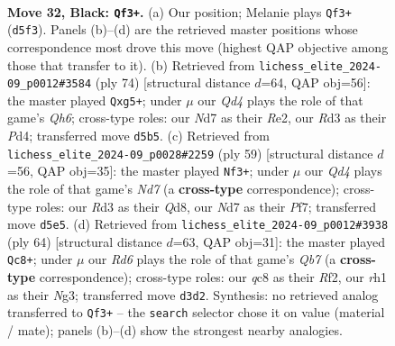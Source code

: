 \documentclass[11pt]{article}
\begin{document}
\clearpage

\begin{figure}[p]\centering
\begin{subfigure}{0.46\textwidth}\centering
\resizebox{\linewidth}{!}{%
\newchessgame
\chessboard[
  setfen={2Q5/pp1n2kp/7p/1P1q4/3P4/3r4/4NK2/R6R b - - 0 32},
  showmover=false,
  pgfstyle=straightmove, color=movearrow, markmove={d5-f3}
]}
\caption{}
\end{subfigure}\hfill
\begin{subfigure}{0.46\textwidth}\centering
\resizebox{\linewidth}{!}{%
\newchessgame
\chessboard[
  setfen={5rk1/p1p5/Pp5Q/1q2N1p1/3P4/7P/4RP2/6K1 w - - 1 38},
  showmover=false,
  pgfstyle=straightmove, color=movearrow, markmove={h6-g5}
]}
\caption{}
\end{subfigure}
\\[4pt]
\begin{subfigure}{0.46\textwidth}\centering
\resizebox{\linewidth}{!}{%
\newchessgame
\chessboard[
  setfen={3q1k2/3P1p1Q/p5p1/1p4P1/8/8/r2n1PP1/1R2R1K1 b - - 2 30},
  showmover=false,
  pgfstyle=straightmove, color=movearrow, markmove={d2-f3}
]}
\caption{}
\end{subfigure}\hfill
\begin{subfigure}{0.46\textwidth}\centering
\resizebox{\linewidth}{!}{%
\newchessgame
\chessboard[
  setfen={7k/pQ5p/8/2p1p1q1/2P2r2/6NP/PP3R1K/8 w - - 1 33},
  showmover=false,
  pgfstyle=straightmove, color=movearrow, markmove={b7-c8}
]}
\caption{}
\end{subfigure}
\caption{\textbf{Move 32, Black: \texttt{Qf3+}.} (a) Our position; Melanie plays \texttt{Qf3+} (\texttt{d5f3}). Panels (b)--(d) are the retrieved master positions whose correspondence most drove this move (highest QAP objective among those that transfer to it). (b) Retrieved from \texttt{lichess\_elite\_2024-09\_p0012\#3584} (ply 74) [structural distance $d$=64, QAP obj=56]: the master played \texttt{Qxg5+}; under $\mu$ our \emph{Qd4} plays the role of that game's \emph{Qh6}; cross-type roles: our \emph{N}d7 as their \emph{R}e2, our \emph{R}d3 as their \emph{P}d4; transferred move \texttt{d5b5}. (c) Retrieved from \texttt{lichess\_elite\_2024-09\_p0028\#2259} (ply 59) [structural distance $d$=56, QAP obj=35]: the master played \texttt{Nf3+}; under $\mu$ our \emph{Qd4} plays the role of that game's \emph{Nd7} (a \textbf{cross-type} correspondence); cross-type roles: our \emph{R}d3 as their \emph{Q}d8, our \emph{N}d7 as their \emph{P}f7; transferred move \texttt{d5e5}. (d) Retrieved from \texttt{lichess\_elite\_2024-09\_p0012\#3938} (ply 64) [structural distance $d$=63, QAP obj=31]: the master played \texttt{Qc8+}; under $\mu$ our \emph{Rd6} plays the role of that game's \emph{Qb7} (a \textbf{cross-type} correspondence); cross-type roles: our \emph{q}c8 as their \emph{R}f2, our \emph{r}h1 as their \emph{N}g3; transferred move \texttt{d3d2}. Synthesis: no retrieved analog transferred to \texttt{Qf3+} -- the \texttt{search} selector chose it on value (material / mate); panels (b)--(d) show the strongest nearby analogies.}
\label{fig:thought-m63}
\end{figure}
\end{document}
